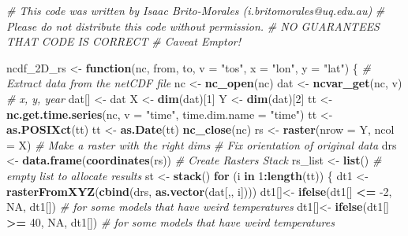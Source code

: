 \documentclass[]{book}
\newenvironment{Shaded}{\begin{snugshade}}{\end{snugshade}}
\newcommand{\CommentTok}[1]{\textcolor[rgb]{0.56,0.35,0.01}{\textit{#1}}}
\newcommand{\ControlFlowTok}[1]{\textcolor[rgb]{0.13,0.29,0.53}{\textbf{#1}}}
\newcommand{\DataTypeTok}[1]{\textcolor[rgb]{0.13,0.29,0.53}{#1}}
\newcommand{\DecValTok}[1]{\textcolor[rgb]{0.00,0.00,0.81}{#1}}
\newcommand{\KeywordTok}[1]{\textcolor[rgb]{0.13,0.29,0.53}{\textbf{#1}}}
\newcommand{\NormalTok}[1]{#1}
\newcommand{\OperatorTok}[1]{\textcolor[rgb]{0.81,0.36,0.00}{\textbf{#1}}}
\newcommand{\OtherTok}[1]{\textcolor[rgb]{0.56,0.35,0.01}{#1}}
\newcommand{\StringTok}[1]{\textcolor[rgb]{0.31,0.60,0.02}{#1}}
\begin{document}
\begin{Shaded}
\begin{Highlighting}[]
\CommentTok{# This code was written by Isaac Brito-Morales (i.britomorales@uq.edu.au)}
\CommentTok{# Please do not distribute this code without permission.}
\CommentTok{# NO GUARANTEES THAT CODE IS CORRECT}
\CommentTok{# Caveat Emptor!}
 
\NormalTok{  ncdf_2D_rs <-}\StringTok{ }\ControlFlowTok{function}\NormalTok{(nc, from, to, }\DataTypeTok{v =} \StringTok{"tos"}\NormalTok{, }\DataTypeTok{x =} \StringTok{"lon"}\NormalTok{, }\DataTypeTok{y =} \StringTok{"lat"}\NormalTok{) \{}
  \CommentTok{# Extract data from the netCDF file  }
\NormalTok{   nc <-}\StringTok{ }\KeywordTok{nc_open}\NormalTok{(nc)}
\NormalTok{   dat <-}\StringTok{ }\KeywordTok{ncvar_get}\NormalTok{(nc, v) }\CommentTok{# x, y, year }
\NormalTok{   dat[] <-}\StringTok{ }\NormalTok{dat}
\NormalTok{   X <-}\StringTok{ }\KeywordTok{dim}\NormalTok{(dat)[}\DecValTok{1}\NormalTok{]}
\NormalTok{   Y <-}\StringTok{ }\KeywordTok{dim}\NormalTok{(dat)[}\DecValTok{2}\NormalTok{]}
\NormalTok{   tt <-}\StringTok{ }\KeywordTok{nc.get.time.series}\NormalTok{(nc, }\DataTypeTok{v =} \StringTok{"time"}\NormalTok{, }\DataTypeTok{time.dim.name =} \StringTok{"time"}\NormalTok{)}
\NormalTok{   tt <-}\StringTok{ }\KeywordTok{as.POSIXct}\NormalTok{(tt)}
\NormalTok{   tt <-}\StringTok{ }\KeywordTok{as.Date}\NormalTok{(tt)}
   \KeywordTok{nc_close}\NormalTok{(nc)}
\NormalTok{   rs <-}\StringTok{ }\KeywordTok{raster}\NormalTok{(}\DataTypeTok{nrow =}\NormalTok{ Y, }\DataTypeTok{ncol =}\NormalTok{ X) }\CommentTok{# Make a raster with the right dims}
  \CommentTok{# Fix orientation of original data}
\NormalTok{    drs <-}\StringTok{ }\KeywordTok{data.frame}\NormalTok{(}\KeywordTok{coordinates}\NormalTok{(rs))}
  \CommentTok{# Create Rasters Stack}
\NormalTok{    rs_list <-}\StringTok{ }\KeywordTok{list}\NormalTok{() }\CommentTok{# empty list to allocate results}
\NormalTok{    st <-}\StringTok{ }\KeywordTok{stack}\NormalTok{()}
    \ControlFlowTok{for}\NormalTok{ (i }\ControlFlowTok{in} \DecValTok{1}\OperatorTok{:}\KeywordTok{length}\NormalTok{(tt)) \{}
\NormalTok{      dt1 <-}\StringTok{ }\KeywordTok{rasterFromXYZ}\NormalTok{(}\KeywordTok{cbind}\NormalTok{(drs, }\KeywordTok{as.vector}\NormalTok{(dat[,, i])))}
\NormalTok{      dt1[]<-}\StringTok{ }\KeywordTok{ifelse}\NormalTok{(dt1[] }\OperatorTok{<=}\StringTok{ }\DecValTok{-2}\NormalTok{, }\OtherTok{NA}\NormalTok{, dt1[]) }\CommentTok{# for some models that have weird temperatures}
\NormalTok{      dt1[]<-}\StringTok{ }\KeywordTok{ifelse}\NormalTok{(dt1[] }\OperatorTok{>=}\StringTok{ }\DecValTok{40}\NormalTok{, }\OtherTok{NA}\NormalTok{, dt1[]) }\CommentTok{# for some models that have weird temperatures}

\end{Highlighting}
\end{Shaded}
\end{document}
